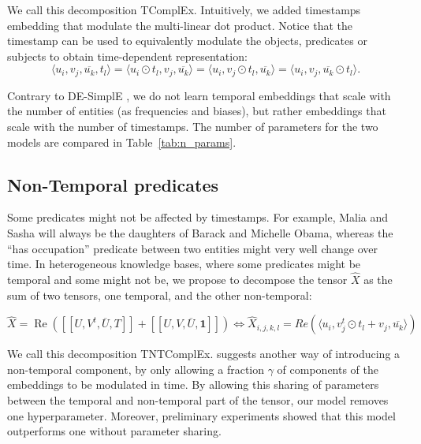 \documentclass{article}
\newcommand{\empx}{\hat{X}}
\newcommand{\brck}[1]{[\![#1]\!]}
\begin{document}
We call this decomposition TComplEx. Intuitively, we added timestamps embedding that modulate the multi-linear dot product. Notice that the timestamp can be used to equivalently modulate the objects, predicates or subjects to obtain time-dependent representation:
\begin{equation}
    \langle u_i, v_j, \overline{u_k}, t_l\rangle = \langle u_i \odot t_l, v_j, \overline{u_k}\rangle = \langle u_i, v_j\odot t_l, \overline{u_k}\rangle = \langle u_i, v_j, \overline{u_k}\odot t_l\rangle.
    \label{eq:equivalent_subject_object}
\end{equation}

Contrary to DE-SimplE \citep{goel2019diachronic}, we do not learn temporal embeddings that scale with the number of entities (as frequencies and biases), but rather embeddings that scale with the number of timestamps. The number of parameters for the two models are compared in Table~\ref{tab:n_params}.





\subsection{Non-Temporal predicates}
Some predicates might not be affected by timestamps. For example, Malia and Sasha will always be the daughters of Barack and Michelle Obama, whereas the ``has occupation'' predicate between two entities might very well change over time. In heterogeneous knowledge bases, where some predicates might be temporal and some might not be, we propose to decompose the tensor $\empx$ as the sum of two tensors, one temporal, and the other non-temporal: 

\begin{equation}
    \empx = \operatorname{Re}\left(\brck{U,V^t,\overline{U}, T} + \brck{U,V,\overline{U}, \mathbf{1}}\right)\iff \empx_{i,j,k,l} = Re\left(\langle u_i, v^t_j\odot t_l + v_j, \overline{u_k}\rangle\right)
    \label{eq:tntcomplex}
\end{equation}

We call this decomposition TNTComplEx. \citet{goel2019diachronic} suggests another way of introducing a non-temporal component, by only allowing a fraction $\gamma$ of components of the embeddings to be modulated in time. By allowing this sharing of parameters between the temporal and non-temporal part of the tensor, our model removes one hyperparameter. Moreover, preliminary experiments showed that this model outperforms one without parameter sharing. 
\end{document}
